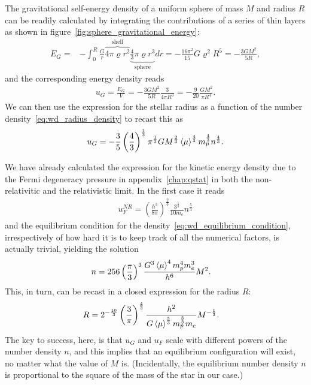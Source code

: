 The gravitational self-energy density of a uniform sphere of mass $M$ and radius
$R$ can be readily calculated by integrating the contributions of a series of
thin layers as shown in figure~\ref{fig:sphere_gravitational_energy}:
\begin{align*}
  E_G = &- \int_0^R \frac{G}{r}
    \overbrace{4\pi \varrho r^2}^\text{shell}
    \underbrace{\frac{4}{3} \pi \varrho r^3}_\text{sphere} dr =
   - \frac{16 \pi^2}{15} G \varrho^2 R^5 = -\frac{3GM^2}{5R},
\end{align*}
and the corresponding energy density reads
\begin{align*}
  u_G = \frac{E_G}{V} =
  -\frac{3GM^2}{5R} \frac{3}{4\pi R^3} = -\frac{9}{20} \frac{GM^2}{\pi R^4}.
\end{align*}
We can then use the expression for the stellar radius as a function of the number
density~\eqref{eq:wd_radius_density} to recast this as
\begin{align}
	u_G = -\frac{3}{5} \left( \frac{4}{3} \right)^\frac{1}{3} \pi^\frac{1}{3} G M^\frac{2}{3}
	\left<\mu\right>^\frac{4}{3} m_p^\frac{4}{3} n^\frac{4}{3}.
\end{align}

We have already calculated the expression for the kinetic energy density due to the
Fermi degeneracy pressure in appendix~\ref{chap:qstat} in both the non-relativitic
and the relativistic limit. In the first case it reads
\begin{align}
  u_F^{NR} = \left( \frac{h^3}{8\pi} \right)^\frac{2}{3}
	\frac{3^\frac{5}{3}}{10 m_e} n^\frac{5}{3}
\end{align}
and the equilibrium condition for the density~\eqref{eq:wd_equilibrium_condition},
irrespectively of how hard it is to keep track of all the numerical factors, is actually
trivial, yielding the solution
\begin{align}\label{eq:wd_n_nr}
  n &= 256 \left( \frac{\pi}{3} \right)^3 \frac{G^3 \left<\mu\right>^4 m_p^4 m_e^3}{h^6} M^2.
\end{align}
This, in turn, can be recast in a closed expression for the radius $R$:
\begin{align}\label{eq:wd_radius_nr}
  R &= 2^{-\frac{10}{3}} \left( \frac{3}{\pi} \right)^\frac{4}{3}
  \frac{h^2}{G \left<\mu\right>^\frac{5}{3} m_p^\frac{5}{3} m_e} M^{-\frac{1}{3}}.
\end{align}
The key to success, here, is that $u_G$ and $u_F$ scale with different powers of the
number density $n$, and this implies that an equilibrium configuration will exist,
no matter what the value of $M$ is. (Incidentally, the equilibrium number density
$n$ is proportional to the square of the mass of the star in our case.)

